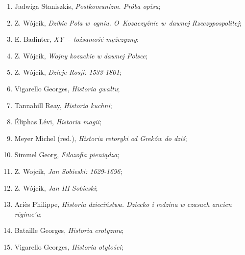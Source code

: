\documentclass[a4paper,11pt]{article}
\begin{document}
\begin{enumerate}
\item Jadwiga Staniszkis, \textit{Postkomunizm. Próba opisu};



\item Z. Wójcik, \textit{Dzikie Pola w~ogniu. O~Kozaczyźnie w~dawnej
    Rzeczypospolitej};



\item E. Badinter, \textit{XY~-- tożsamość mężczyzny};



\item Z. Wójcik, \textit{Wojny kozackie w dawnej Polsce};



\item Z. Wójcik, \textit{Dzieje Rosji: 1533-1801};



\item Vigarello Georges, \textit{Historia gwałtu};



\item Tannahill Reay, \textit{Historia kuchni};



\item Éliphas Lévi, \textit{Historia magii};



\item Meyer Michel (red.), \textit{Historia retoryki od Greków do dziś};



\item Simmel Georg, \textit{Filozofia pieniądza};



\item Z. Wojcik, \textit{Jan Sobieski: 1629-1696};



\item Z. Wójcik, \textit{Jan III Sobieski};



\item Ariès Philippe, \textit{Historia dzieciństwa. Dziecko i rodzina w
    czasach ancien régime’u};



\item Bataille Georges, \textit{Historia erotyzmu};



\item Vigarello Georges, \textit{Historia otyłości};




\end{enumerate}
\end{document}
